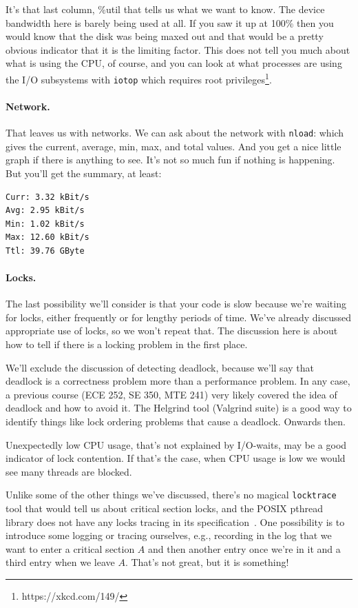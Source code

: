 \documentclass[a4paper]{report}
\begin{document}
It's that last column, \%util that tells us what we want to know. The device bandwidth here is barely being used at all. If you saw it up at 100\% then you would know that the disk was being maxed out and that would be a pretty obvious indicator that it is the limiting factor. This does not tell you much about what is using the CPU, of course, and you can look at what processes are using the I/O subsystems with \texttt{iotop} which requires root privileges\footnote{https://xkcd.com/149/}.

\paragraph{Network.} That leaves us with networks. We can ask about the network with \texttt{nload}: which gives the current, average, min, max, and total values. And you get a nice little graph if there is anything to see. It's not so much fun if nothing is happening. But you'll get the summary, at least:

\begin{verbatim}
Curr: 3.32 kBit/s
Avg: 2.95 kBit/s
Min: 1.02 kBit/s
Max: 12.60 kBit/s
Ttl: 39.76 GByte                                                                                       \end{verbatim}

\paragraph{Locks.}
The last possibility we'll consider is that your code is slow because we're waiting for locks, either frequently or for lengthy periods of time. We've already discussed appropriate use of locks, so we won't repeat that. The discussion here is about how to tell if there is a locking problem in the first place.

We'll exclude the discussion of detecting deadlock, because we'll say that deadlock is a correctness problem more than a performance problem. In any case, a previous course (ECE 252, SE 350, MTE 241) very likely covered the idea of deadlock and how to avoid it. The Helgrind tool (Valgrind suite) is a good way to identify things like lock ordering problems that cause a deadlock. Onwards then. 

Unexpectedly low CPU usage, that's not explained by I/O-waits, may be a good indicator of lock contention. If that's the case, when CPU usage is low we would see many threads are blocked. 

Unlike some of the other things we've discussed, there's no magical \texttt{locktrace} tool that would tell us about critical section locks, and the POSIX pthread library does not have any locks tracing in its specification~\cite{usd}. One possibility is to introduce some logging or tracing ourselves, e.g., recording in the log that we want to enter a critical section $A$ and then another entry once we're in it and a third entry when we leave $A$. That's not great, but it is something! 
\end{document}
